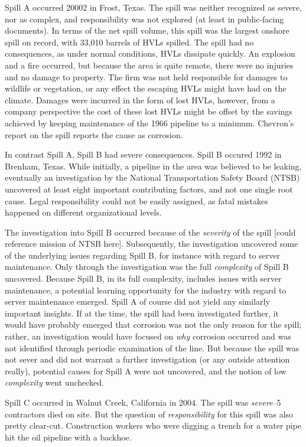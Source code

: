 \documentclass[12pt, man, natbib]{apa6}
\begin{document}
	Spill A occurred 20002 in Frost, Texas. The spill was neither recognized as severe, nor as complex, and responsibility was not explored (at least in public-facing documents). In terms of the net spill volume, this spill was the largest onshore spill on record, with 33,010 barrels of HVLs spilled. The spill had no consequences, as under normal conditions, HVLs dissipate quickly. An explosion and a fire occurred, but because the area is quite remote, there were no injuries and no damage to property. The firm was not held responsible for damages to wildlife or vegetation, or any effect the escaping HVLs might have had on the climate. Damages were incurred in the form of lost HVLs, however, from a company perspective the cost of these lost HVLs might be offset by the savings achieved by keeping maintenance of the 1966 pipeline to a minimum. Chevron's report on the spill reports the cause as corrosion.
	
	In contrast Spill A, Spill B had severe consequences. Spill B occured 1992 in Brenham, Texas. While initially, a pipeline in the area was believed to be leaking, eventually an investigation by the National Transportation Safety Board (NTSB) uncovered at least eight important contributing factors, and not one single root cause. Legal responsibility could not be easily assigned, as fatal mistakes happened on different organizational levels. 
	
	The investigation into Spill B occurred because of the \textit{severity} of the spill [could reference mission of NTSB here]. Subsequently, the investigation uncovered some of the underlying issues regarding Spill B, for instance with regard to server maintenance. Only through the investigation was the full \textit{complexity} of Spill B uncovered. Because Spill B, in its full complexity, includes issues with server maintenance, a potential learning opportunity for the industry with regard to server maintenance emerged. Spill A of course did not yield any similarly important insights. If at the time, the spill had been investigated further, it would have probably emerged that corrosion was not the only reason for the spill; rather, an investigation would have focused on \textit{why} corrosion occurred and was not identified through periodic examination of the line. But because the spill was not sever and did not warrant a further investigation (or any outside attention really), potential causes for Spill A were not uncovered, and the notion of low \textit{complexity} went unchecked.
	
	Spill C occurred in Walnut Creek, California in 2004. The spill was \textit{severe}--5 contractors died on site. But the question of \textit{responsibility} for this spill was also pretty clear-cut. Construction workers who were digging a trench for a water pipe hit the oil pipeline with a backhoe.
	
\end{document}
